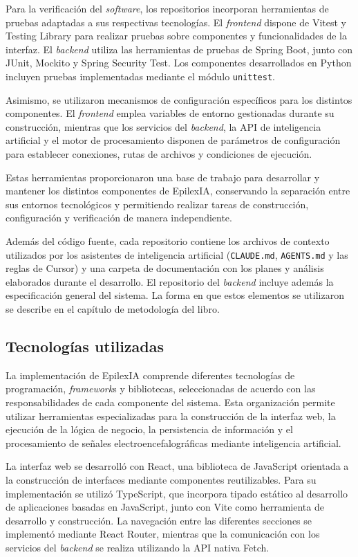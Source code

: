 Para la verificación del \textit{software}, los repositorios incorporan herramientas de pruebas adaptadas a sus respectivas tecnologías. El \textit{frontend} dispone de Vitest y Testing Library para realizar pruebas sobre componentes y funcionalidades de la interfaz. El \textit{backend} utiliza las herramientas de pruebas de Spring Boot, junto con JUnit, Mockito y Spring Security Test. Los componentes desarrollados en Python incluyen pruebas implementadas mediante el módulo \texttt{unittest}.

Asimismo, se utilizaron mecanismos de configuración específicos para los distintos componentes. El \textit{frontend} emplea variables de entorno gestionadas durante su construcción, mientras que los servicios del \textit{backend}, la API de inteligencia artificial y el motor de procesamiento disponen de parámetros de configuración para establecer conexiones, rutas de archivos y condiciones de ejecución.

Estas herramientas proporcionaron una base de trabajo para desarrollar y mantener los distintos componentes de EpilexIA, conservando la separación entre sus entornos tecnológicos y permitiendo realizar tareas de construcción, configuración y verificación de manera independiente.


Además del código fuente, cada repositorio contiene los archivos de contexto utilizados por los asistentes de inteligencia artificial (\texttt{CLAUDE.md}, \texttt{AGENTS.md} y las reglas de Cursor) y una carpeta de documentación con los planes y análisis elaborados durante el desarrollo.
El repositorio del \textit{backend} incluye además la especificación general del sistema.
La forma en que estos elementos se utilizaron se describe en el capítulo de metodología del libro.

\subsection{Tecnologías utilizadas}

La implementación de EpilexIA comprende diferentes tecnologías de
programación, \textit{framework}s y bibliotecas, seleccionadas de acuerdo con
las responsabilidades de cada componente del sistema. Esta organización
permite utilizar herramientas especializadas para la construcción de
la interfaz web, la ejecución de la lógica de negocio, la persistencia
de información y el procesamiento de señales electroencefalográficas
mediante inteligencia artificial.

La interfaz web se desarrolló con React, una biblioteca de JavaScript
orientada a la construcción de interfaces mediante componentes
reutilizables. Para su implementación se utilizó TypeScript, que
incorpora tipado estático al desarrollo de aplicaciones basadas en
JavaScript, junto con Vite como herramienta de desarrollo y
construcción. La navegación entre las diferentes secciones se
implementó mediante React Router, mientras que la comunicación con
los servicios del \textit{backend} se realiza utilizando la API nativa Fetch.

